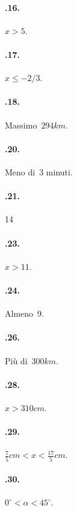 \begin{multicols}{2}
\paragraph{\thechapter.16.} $x>5$.

\paragraph{\thechapter.17.} $x\le -2/3$.

\paragraph{\thechapter.18.} Massimo~$294\unit{km}$.

\paragraph{\thechapter.20.} Meno di~3 minuti.

\paragraph{\thechapter.21.} 14

\paragraph{\thechapter.23.} $x>11$.

\paragraph{\thechapter.24.} Almeno~9.

\paragraph{\thechapter.26.} Più di~$300\unit{km}$.

\paragraph{\thechapter.28.} $x>310\unit{cm}$.

\paragraph{\thechapter.29.} $\frac{7}{5}\unit{cm}<x<\frac{17}{5}\unit{cm}$.

\paragraph{\thechapter.30.} $0^{\circ}<\alpha<45^{\circ}$.


\end{multicols}
